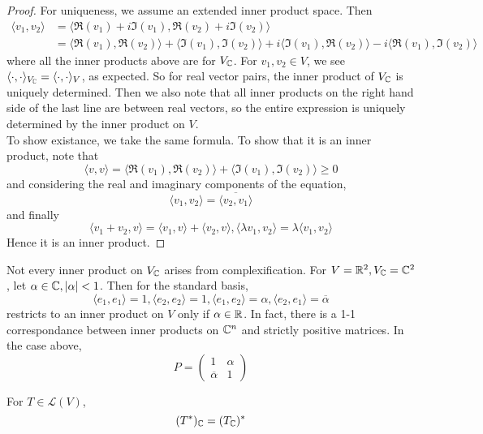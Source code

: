 \documentclass[12pt]{article}
\begin{document}
\begin{proof}
    For uniqueness, we assume an extended inner product space. Then
    \begin{align*}
        \langle v_1,v_2 \rangle &= \langle \Re(v_1)+i\Im(v_1),\Re(v_2)+i\Im(v_2) \rangle \\
                                &= \langle \Re(v_1),\Re(v_2) \rangle + \langle \Im(v_1),\Im(v_2) \rangle + i \langle \Im(v_1),\Re(v_2) \rangle - i \langle \Re(v_1),\Im(v_2) \rangle
    \end{align*}
    where all the inner products above are for $V_{\mathbb{C}}$. For $v_1,v_2 \in V$, we see $\langle \cdot,\cdot \rangle_{V_{\mathbb{C}}} = \langle \cdot,\cdot \rangle_V$, as expected. So for real vector pairs, the inner product of $V_{\mathbb{C}}$ is uniquely determined. Then we also note that all inner products on the right hand side of the last line are between real vectors, so the entire expression is uniquely determined by the inner product on $V$. \\
    To show existance, we take the same formula. To show that it is an inner product, note that
    $$\langle v,v \rangle = \langle \Re(v_1),\Re(v_2) \rangle + \langle \Im(v_1),\Im(v_2) \rangle \geq 0$$
    and considering the real and imaginary components of the equation,
    $$\langle v_1,v_2 \rangle = \overline{\langle v_2,v_1 \rangle}$$
    and finally
    $$\langle v_1+v_2,v \rangle = \langle v_1,v \rangle + \langle v_2,v \rangle, \langle \lambda v_1,v_2 \rangle = \lambda \langle v_1,v_2 \rangle$$
    Hence it is an inner product.
\end{proof}

\begin{ex}
    Not every inner product on $V_{\mathbb{C}}$ arises from complexification. For $V=\mathbb{R}^2,V_{\mathbb{C}}=\mathbb{C}^2$, let $\alpha \in \mathbb{C}, |\alpha| < 1$. Then for the standard basis,
    $$\langle e_1,e_1 \rangle = 1, \langle e_2,e_2 \rangle = 1, \langle e_1,e_2 \rangle = \alpha, \langle e_2,e_1 \rangle = \overline \alpha$$
    restricts to an inner product on $V$ only if $\alpha \in \mathbb{R}$. In fact, there is a 1-1 correspondance between inner products on $\mathbb{C}^n$ and strictly positive matrices. In the case above,
    $$P = \begin{pmatrix} 1 & \alpha \\ \overline \alpha & 1 \end{pmatrix}$$
\end{ex}

\begin{lem}
    For $T \in \mathcal L(V)$,
    $$(T^*)_{\mathbb{C}} = (T_{\mathbb{C}})^*$$
\end{lem}
\end{document}
